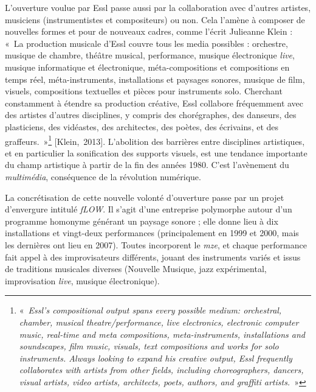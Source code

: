 \documentclass[a4paper,12pt]{article}
\newcommand{\guill}[1]{«~#1~»}
\newcommand{\maze}[0]{\emph{m\symbol{64}ze\textdegree2}}
\newcommand{\cicite}[1]{{\footnotesize[#1]}}
\begin{document}
L'ouverture voulue par Essl passe aussi par la collaboration avec d'autres artistes, musiciens (instrumentistes et compositeurs) ou non. Cela l'amène à composer de nouvelles formes et pour de nouveaux cadres, comme l'écrit Julieanne Klein : \guill{La production musicale d'Essl couvre tous les media possibles : orchestre, musique de chambre, théâtre musical, performance, musique électronique \emph{live}, musique informatique et électronique, méta-compositions et compositions en temps réel, méta-instruments, installations et paysages sonores, musique de film, visuels, compositions textuelles et pièces pour instruments solo. Cherchant constamment à étendre sa production créative, Essl collabore fréquemment avec des artistes d'autres disciplines, y compris des chorégraphes, des danseurs, des plasticiens, des vidéastes, des architectes, des poètes, des écrivains, et des graffeurs.}\footnote{\guill{\emph{Essl's compositional output spans every possible medium\!: orchestral, chamber, musical theatre/performance, live electronics, electronic computer music, real-time and meta compositions, meta-instruments, installations and soundscapes, film music, visuals, text compositions and works for solo instruments. Always looking to expand his creative output, Essl frequently collaborates with artists from other fields, including choreographers, dancers, visual artists, video artists, architects, poets, authors, and graffiti artists.}}} \cicite{Klein,~2013}. L'abolition des barrières entre disciplines artistiques, et en particulier la sonification des supports visuels, est une tendance importante du champ artistique à partir de la fin des années 1980. C'est l'avènement du \emph{multimédia}, conséquence de la révolution numérique.

La concrétisation de cette nouvelle volonté d'ouverture passe par un projet d'envergure intitulé \emph{fLOW}. Il s'agit d'une entreprise polymorphe autour d'un programme homonyme générant un paysage sonore ; elle donne lieu à dix installations et vingt-deux performances (principalement en 1999 et 2000, mais les dernières ont lieu en 2007). Toutes incorporent le \maze, et chaque performance fait appel à des improvisateurs différents, jouant des instruments variés et issus de traditions musicales diverses (Nouvelle Musique, jazz expérimental, improvisation \emph{live}, musique électronique).
\end{document}
